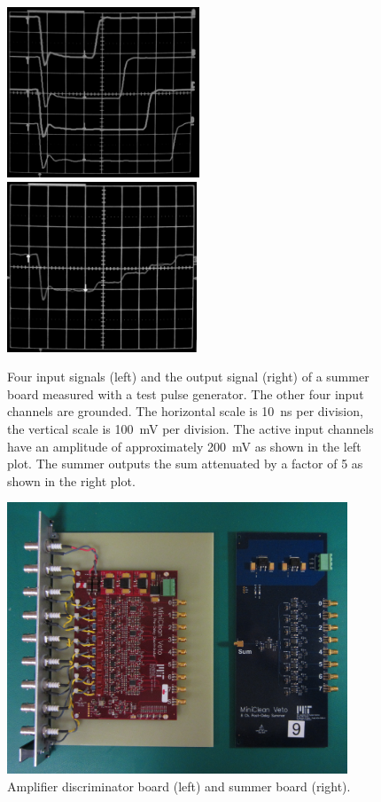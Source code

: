 \documentclass[review,number,sort&compress]{elsarticle}
\begin{document}
\begin{figure}[ht]
	\begin{center}
		\includegraphics[height=2in, keepaspectratio=true]{graphics/sumpulseinput_bw.png}
		\includegraphics[height=2in, keepaspectratio=true]{graphics/sumpulseoutput_bw.png}
		\caption{Four input signals (left) and the output signal (right) of a summer board measured with a test pulse generator. The other four input channels are grounded. The horizontal scale is 10~ns per division, the vertical scale is 100~mV per division.  The active input channels have an amplitude of approximately 200~mV as shown in the left plot.  The summer outputs the sum attenuated by a factor of 5 as shown in the right plot.
		\label{fig:summerpulse}}
	\end{center}
\end{figure}

\begin{figure}[ht]
\begin{center}
\includegraphics[width=4in, keepaspectratio=true]{graphics/boards.JPG}
\caption{Amplifier discriminator board (left) and summer board (right).
\label{fig:boards}}
\end{center}
\end{figure}
\end{document}
